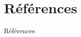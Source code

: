 \documentclass[8pt]{beamer}
\begin{document}


	\section{Références}
	\begin{frame}[allowframebreaks]{Références}
		\nocite{sklearn_api}
		
		
	\end{frame}
\end{document}
